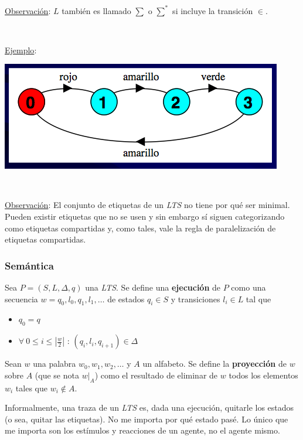 \documentclass[]{article}
\begin{document}
\underline{Observación}: $L$ también es llamado $\sum$ o $\sum^*$ si incluye la transición $\in$.

~\newline


\underline{Ejemplo}:
\begin{center}
	\includegraphics[scale=0.5]{LTSe.png}
\end{center}

~\newline

\underline{Observación}: El conjunto de etiquetas de un \textit{LTS} no tiene por qué ser minimal. Pueden existir etiquetas que no se usen y sin embargo sí siguen categorizando como etiquetas compartidas y, como tales, vale la regla de paralelización de etiquetas compartidas.

\subsubsection{Semántica}
Sea $P = (S,L,\Delta,q)$ una \textit{LTS}. Se define una \textbf{ejecución} de $P$ como una secuencia $w = q_0,l_0,q_1,l_1, \hdots$ de estados $q_i \in S$ y transiciones $l_i \in L$ tal que
\begin{itemize}
	\item $q_0 = q$
	\item $\displaystyle \forall \ 0 \leq i \leq \left | \frac{w}{2}\right |$ : $(q_i,l_i,q_{i+1}) \in \Delta$
\end{itemize}

Sean $w$ una palabra $w_0,w_1,w_2,\hdots$ y $A$ un alfabeto. Se define la \textbf{proyección} de $w$ sobre $A$ (que se nota $w|_A$) como el resultado de eliminar de $w$ todos los elementos $w_i$ tales que $w_i\not\in A$.

Informalmente, una traza de un \textit{LTS} es, dada una ejecución, quitarle los estados (o sea, quitar las etiquetas). No me importa por qué estado pasé. Lo único que me importa son los estímulos y reacciones de un agente, no el agente mismo.
\end{document}
